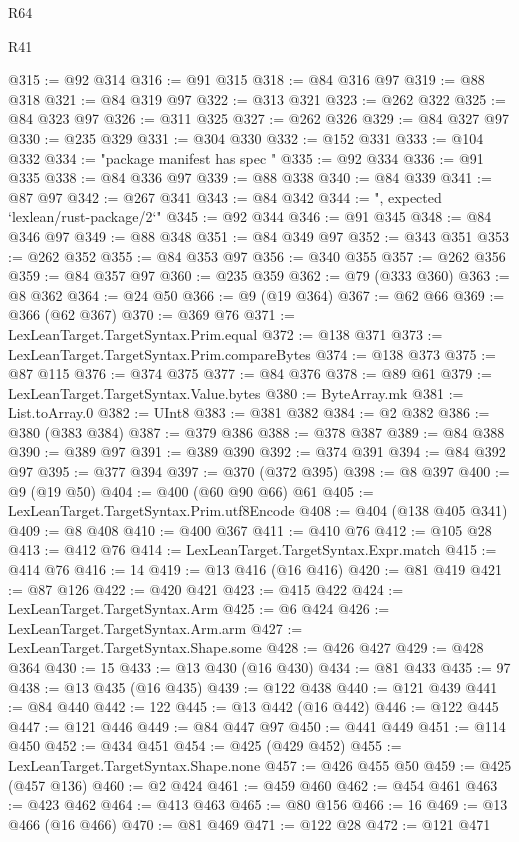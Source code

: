 \begin{lexlean}{R64}
\begin{lexlean}{R41}
\begin{coremodule}
{{{{{{{{{{{{{{{{{{{{{{{{{{{{{{{{{{{{{{{{{{{{{{{{{{{{{{{{{{{{{{{{{{{{{{{{{{{{{{{{{{{{{{{{{@315 := @92 @314
@316 := @91 @315
@318 := @84 @316 @97
@319 := @88 @318
@321 := @84 @319 @97
@322 := @313 @321
@323 := @262 @322
@325 := @84 @323 @97
@326 := @311 @325
@327 := @262 @326
@329 := @84 @327 @97
@330 := @235 @329
@331 := @304 @330
@332 := @152 @331
@333 := @104 @332
@334 := "package manifest has spec "
@335 := @92 @334
@336 := @91 @335
@338 := @84 @336 @97
@339 := @88 @338
@340 := @84 @339
@341 := @87 @97
@342 := @267 @341
@343 := @84 @342
@344 := ", expected `lexlean/rust-package/2`"
@345 := @92 @344
@346 := @91 @345
@348 := @84 @346 @97
@349 := @88 @348
@351 := @84 @349 @97
@352 := @343 @351
@353 := @262 @352
@355 := @84 @353 @97
@356 := @340 @355
@357 := @262 @356
@359 := @84 @357 @97
@360 := @235 @359
@362 := @79 (@333 @360)
@363 := @8 @362
@364 := @24 @50
@366 := @9 (@19 @364)
@367 := @62 @66
@369 := @366 (@62 @367)
@370 := @369 @76
@371 := LexLeanTarget.TargetSyntax.Prim.equal
@372 := @138 @371
@373 := LexLeanTarget.TargetSyntax.Prim.compareBytes
@374 := @138 @373
@375 := @87 @115
@376 := @374 @375
@377 := @84 @376
@378 := @89 @61
@379 := LexLeanTarget.TargetSyntax.Value.bytes
@380 := ByteArray.mk
@381 := List.toArray.{0}
@382 := UInt8
@383 := @381 @382
@384 := @2 @382
@386 := @380 (@383 @384)
@387 := @379 @386
@388 := @378 @387
@389 := @84 @388
@390 := @389 @97
@391 := @389 @390
@392 := @374 @391
@394 := @84 @392 @97
@395 := @377 @394
@397 := @370 (@372 @395)
@398 := @8 @397
@400 := @9 (@19 @50)
@404 := @400 (@60 @90 @66) @61
@405 := LexLeanTarget.TargetSyntax.Prim.utf8Encode
@408 := @404 (@138 @405 @341)
@409 := @8 @408
@410 := @400 @367
@411 := @410 @76
@412 := @105 @28
@413 := @412 @76
@414 := LexLeanTarget.TargetSyntax.Expr.match
@415 := @414 @76
@416 := 14
@419 := @13 @416 (@16 @416)
@420 := @81 @419
@421 := @87 @126
@422 := @420 @421
@423 := @415 @422
@424 := LexLeanTarget.TargetSyntax.Arm
@425 := @6 @424
@426 := LexLeanTarget.TargetSyntax.Arm.arm
@427 := LexLeanTarget.TargetSyntax.Shape.some
@428 := @426 @427
@429 := @428 @364
@430 := 15
@433 := @13 @430 (@16 @430)
@434 := @81 @433
@435 := 97
@438 := @13 @435 (@16 @435)
@439 := @122 @438
@440 := @121 @439
@441 := @84 @440
@442 := 122
@445 := @13 @442 (@16 @442)
@446 := @122 @445
@447 := @121 @446
@449 := @84 @447 @97
@450 := @441 @449
@451 := @114 @450
@452 := @434 @451
@454 := @425 (@429 @452)
@455 := LexLeanTarget.TargetSyntax.Shape.none
@457 := @426 @455 @50
@459 := @425 (@457 @136)
@460 := @2 @424
@461 := @459 @460
@462 := @454 @461
@463 := @423 @462
@464 := @413 @463
@465 := @80 @156
@466 := 16
@469 := @13 @466 (@16 @466)
@470 := @81 @469
@471 := @122 @28
@472 := @121 @471
}}}}}}}}}}}}}}}}}}}}}}}}}}}}}}}}}}}}}}}}}}}}}}}}}}}}}}}}}}}}}}}}}}}}}}}}}}}}}}}}}}}}}}}}}
\end{coremodule}
\end{lexlean}
\end{lexlean}

